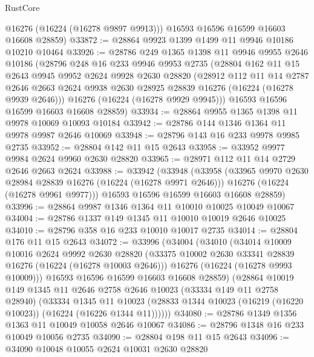 \begin{lexlean}{RustCore}
\begin{coremodule}
        @16276
        (@16224 (@16278 @9897 @9913)))
      @16593
      @16596
      @16599
      @16603
      @16608
      @28859)
@33872 := @28864 @9923 @1399 @1499 @11 @9946 @10186 @10210 @10464
@33926 := @28786
    @249
    @1365
    @1398
    @11
    @9946
    @9955
    @2646
    @10186
    (@28796
      @248
      @16
      @233
      @9946
      @9953
      @2735
      (@28804
        @162
        @11
        @15
        @2643
        @9945
        @9952
        @2624
        @9928
        @2630
        @28820
        (@28912
          @112
          @11
          @14
          @2787
          @2646
          @2663
          @2624
          @9938
          @2630
          @28925
          @28839
          @16276
          (@16224 (@16278 @9939 @2646)))
        @16276
        (@16224 (@16278 @9929 @9945)))
      @16593
      @16596
      @16599
      @16603
      @16608
      @28859)
@33934 := @28864 @9955 @1365 @1398 @11 @9978 @10069 @10093 @10184
@33942 := @28786 @144 @1346 @1364 @11 @9978 @9987 @2646 @10069
@33948 := @28796 @143 @16 @233 @9978 @9985 @2735
@33952 := @28804 @142 @11 @15 @2643
@33958 := @33952 @9977 @9984 @2624 @9960 @2630 @28820
@33965 := @28971 @112 @11 @14 @2729 @2646 @2663 @2624
@33988 := @33942
    (@33948
      (@33958
        (@33965 @9970 @2630 @28984 @28839 @16276 (@16224 (@16278 @9971 @2646)))
        @16276
        (@16224 (@16278 @9961 @9977)))
      @16593
      @16596
      @16599
      @16603
      @16608
      @28859)
@33996 := @28864 @9987 @1346 @1364 @11 @10010 @10025 @10049 @10067
@34004 := @28786 @1337 @149 @1345 @11 @10010 @10019 @2646 @10025
@34010 := @28796 @358 @16 @233 @10010 @10017 @2735
@34014 := @28804 @176 @11 @15 @2643
@34072 := @33996
    (@34004
      (@34010
        (@34014
          @10009
          @10016
          @2624
          @9992
          @2630
          @28820
          (@33375 @10002 @2630 @33341 @28839 @16276 (@16224 (@16278 @10003 @2646)))
          @16276
          (@16224 (@16278 @9993 @10009)))
        @16593
        @16596
        @16599
        @16603
        @16608
        @28859)
      (@28864
        @10019
        @149
        @1345
        @11
        @2646
        @2758
        @2646
        @10023
        (@33334 @149 @11 @2758 @28940)
        (@33334
          @1345
          @11
          @10023
          (@28833 @1344 @10023 (@16219 (@16220 @10023)) (@16224 (@16226 @1344 @11))))))
@34080 := @28786 @1349 @1356 @1363 @11 @10049 @10058 @2646 @10067
@34086 := @28796 @1348 @16 @233 @10049 @10056 @2735
@34090 := @28804 @198 @11 @15 @2643
@34096 := @34090 @10048 @10055 @2624 @10031 @2630 @28820

\end{coremodule}
\end{lexlean}
